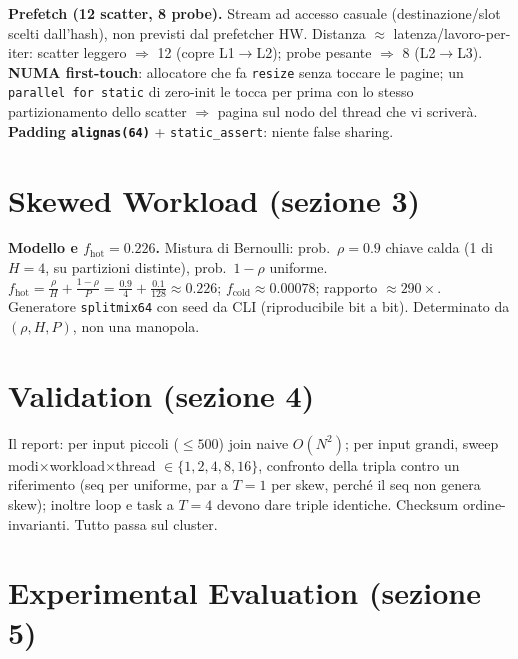 \documentclass[11pt,a4paper]{article}
\begin{document}
\begin{motiv}
\textbf{Prefetch (12 scatter, 8 probe).} Stream ad accesso casuale (destinazione/slot scelti dall'hash), non previsti dal prefetcher HW. Distanza $\approx$ latenza/lavoro-per-iter: scatter leggero $\Rightarrow$ 12 (copre L1$\to$L2); probe pesante $\Rightarrow$ 8 (L2$\to$L3). \textbf{NUMA first-touch}: allocatore che fa \texttt{resize} senza toccare le pagine; un \texttt{parallel for static} di zero-init le tocca per prima con lo stesso partizionamento dello scatter $\Rightarrow$ pagina sul nodo del thread che vi scriverà. \textbf{Padding \texttt{alignas(64)}} + \texttt{static\_assert}: niente false sharing.
\end{motiv}

\section{Skewed Workload (sezione 3)}

\begin{deriv}
\textbf{Modello e $f_\text{hot}=0.226$.} Mistura di Bernoulli: prob.\ $\rho=0.9$ chiave calda (1 di $H=4$, su partizioni distinte), prob.\ $1-\rho$ uniforme. $f_\text{hot}=\frac{\rho}{H}+\frac{1-\rho}{P}=\frac{0.9}{4}+\frac{0.1}{128}\approx0.226$; $f_\text{cold}\approx0.00078$; rapporto $\approx290\times$. Generatore \texttt{splitmix64} con seed da CLI (riproducibile bit a bit). Determinato da $(\rho,H,P)$, non una manopola.
\end{deriv}

\section{Validation (sezione 4)}

Il report: per input piccoli ($\le500$) join naive $O(N^2)$; per input grandi, sweep modi$\times$workload$\times$thread $\in\{1,2,4,8,16\}$, confronto della tripla contro un riferimento (seq per uniforme, par a $T=1$ per skew, perché il seq non genera skew); inoltre loop e task a $T=4$ devono dare triple identiche. Checksum ordine-invarianti. Tutto passa sul cluster.

\section{Experimental Evaluation (sezione 5)}
\end{document}
